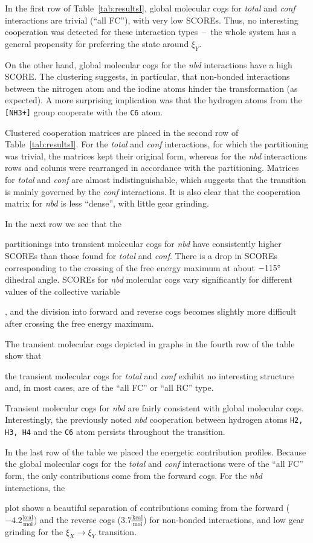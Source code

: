 In the first row of Table~\ref{tab:resultsI}, global molecular cogs for \emph{total} and \emph{conf} interactions are trivial (``all FC''){\color{black}, with very low SCOREs.
Thus, }no interesting cooperation was detected for these interaction types~--~the whole system has a general propensity for preferring the state around $\xi_Y$.   
{\color{black} On the other hand, global molecular cogs for the \emph{nbd} interactions have a high SCORE.
The clustering suggests, in particular, that non-bonded interactions between the nitrogen atom and the iodine atoms hinder the transformation (as expected).
A more surprising implication was that the hydrogen atoms from the \texttt{[NH3+]} group cooperate with the \texttt{C6} atom.

Clustered cooperation matrices are placed in the second row of Table~\ref{tab:resultsI}.
For the \emph{total} and \emph{conf} interactions, for which the partitioning was trivial, the matrices kept their original form, whereas for the \emph{nbd} interactions rows and colums were rearranged in accordance with the partitioning.
Matrices for \emph{total} and \emph{conf} are almost indistinguishable, which suggests that the transition is mainly governed by the \emph{conf} interactions.
It is also clear that the cooperation matrix for \emph{nbd} is less ``dense'', with little gear grinding.

In the next row we see that the} partitionings into transient molecular cogs for \emph{nbd} have consistently higher SCOREs than those found for \emph{total} and \emph{conf}.
There is a drop in SCOREs corresponding to the crossing of the free energy {\color{black}maximum} at about $-115\degree$ dihedral angle.
SCOREs for \emph{nbd} molecular cogs vary significantly for different values of the collective variable{\color{black}, and the division into forward and reverse cogs becomes slightly more difficult after crossing the free energy maximum.

The transient molecular cogs depicted in graphs in the fourth row of the table show that} the transient molecular cogs for \emph{total} and \emph{conf} exhibit no interesting structure and, in most cases, are of the ``all FC'' or ``all RC'' type.
{\color{black}Transient molecular cogs for \emph{nbd} are fairly consistent with global molecular cogs.
Interestingly, the previously noted \emph{nbd} cooperation between hydrogen atoms \texttt{H2, H3, H4} and the \texttt{C6} atom persists throughout the transition.

In the last row of the table we placed the energetic contribution profiles.
Because the global molecular cogs for the \emph{total} and \emph{conf} interactions were of the ``all FC'' form, {\color{black}the only contributions come from the forward cogs.}
For the \emph{nbd} interactions, the }plot shows a beautiful separation of contributions coming from the forward ($-4.2\frac{\text{kcal}}{\text{mol}}$) and the reverse cogs ($3.7\frac{\text{kcal}}{\text{mol}}$) for non-bonded interactions, and low gear grinding for the $\xi_X\to\xi_Y$ transition.

